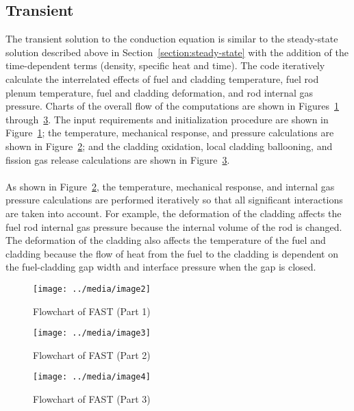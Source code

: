 \subsection{Transient} \label{section:transient}
The transient solution to the conduction equation is similar to the steady-state solution described
above in Section~\ref{section:steady-state} with the addition of the time-dependent terms (density,
specific heat and time).  The code iteratively calculate the interrelated effects of fuel and
cladding temperature, fuel rod plenum temperature, fuel and cladding deformation, and rod internal
gas pressure. Charts of the overall flow of the computations are shown in
Figures~\ref{fig:FAST-flowchart-part1} through~\ref{fig:FAST-flowchart-part3}. The input
requirements and initialization procedure are shown in Figure~\ref{fig:FAST-flowchart-part1}; the
temperature, mechanical response, and pressure calculations are shown in
Figure~\ref{fig:FAST-flowchart-part2}; and the cladding oxidation, local cladding ballooning, and
fission gas release calculations are shown in Figure~\ref{fig:FAST-flowchart-part3}.
\\
\\
As shown in Figure~\ref{fig:FAST-flowchart-part2}, the temperature, mechanical response, and
internal gas pressure calculations are performed iteratively so that all significant interactions
are taken into account.  For example, the deformation of the cladding affects the fuel rod internal
gas pressure because the internal volume of the rod is changed. The deformation of the cladding also
affects the temperature of the fuel and cladding because the flow of heat from the fuel to the
cladding is dependent on the fuel-cladding gap width and interface pressure when the gap is closed.

\begin{figure}[H]
    \texttt{[image: ../media/image2]}
    \caption{Flowchart of FAST (Part 1)}
    \label{fig:FAST-flowchart-part1}
\end{figure}

\begin{figure}
    \centering
    \texttt{[image: ../media/image3]}
    \caption{Flowchart of FAST (Part 2)}
    \label{fig:FAST-flowchart-part2}
\end{figure}

\begin{figure}
    \centering
    \texttt{[image: ../media/image4]}
    \caption{Flowchart of FAST (Part 3)}
    \label{fig:FAST-flowchart-part3}
\end{figure}

